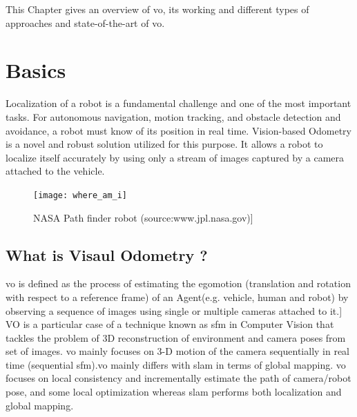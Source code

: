 This Chapter gives an overview of \acrlong{vo}, its working and different types of approaches and state-of-the-art of \acrlong{vo}.   

\section{Basics}
Localization of a robot is a fundamental challenge and one of the most
important tasks. For autonomous navigation, motion tracking, and obstacle detection and avoidance, a robot must know of its position in real time. Vision-based Odometry is a novel and robust solution utilized for this purpose.\cite{Aqel-et-al-2016} It allows a robot to localize itself accurately by using only a stream of images captured by a camera attached to the vehicle.

\begin{figure}[h]
	\centering
	\texttt{[image: where\_am\_i]}
	\caption{NASA Path finder robot (source:www.jpl.nasa.gov)]}
\end{figure}

\subsection{What is Visaul Odometry ?}
\acrshort{vo} is defined as the process of estimating the egomotion (translation and rotation with respect to a reference frame) of an Agent(e.g. vehicle, human and robot) by observing a sequence of images using single or multiple cameras attached to it.\cite{KhalidYousif-et-al-2015}] VO is a particular case of a technique known as \acrfull{sfm} in Computer Vision that tackles the problem of 3D reconstruction of environment and camera poses from set of images\cite{ScaramuzzaVO}. \acrshort{vo} mainly focuses on 3-D motion of the camera sequentially in real time (sequential \acrshort{sfm}).\acrshort{vo} mainly differs with \acrshort{slam} in terms of global mapping. \acrshort{vo} focuses on local consistency and incrementally estimate the path of camera/robot pose, and some local optimization whereas \acrshort{slam} performs both localization and global mapping.

